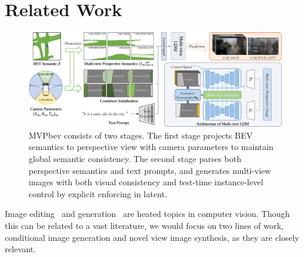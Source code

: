 \section{Related Work}
\label{sec:relatedwork}

\begin{figure}[t]
\centering
\includegraphics[width=0.95\linewidth]{figures/main.png}
\caption{MVPbev consists of two stages. The first stage projects BEV semantics to perspective view with camera parameters to maintain global semantic consistency. The second stage parses both perspective semantics and text prompts, and generates multi-view images with both visual consistency and test-time instance-level control by explicit enforcing in latent.
}
\label{fig:main}
\end{figure}

Image editing~\cite{imageedit} and generation~\cite{rombach2021highresolution} are heated topics in computer vision. Though this can be related to a vast literature, we would focus on two lines of work, conditional image generation and novel view image synthesis, as they are closely relevant.

